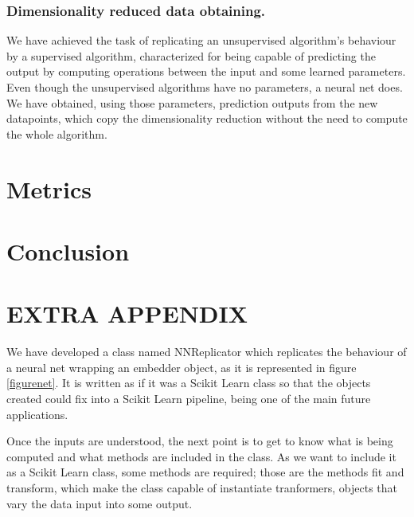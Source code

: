 \documentclass[a4paper,11pt,spanish]{report}
\begin{document}
\subsection{Dimensionality reduced data obtaining.}
\label{ssec:trans}

We have achieved the task of replicating an unsupervised algorithm's behaviour by a supervised algorithm, characterized for being capable of predicting the output by computing operations between the input and some learned parameters.
Even though the unsupervised algorithms have no parameters, a neural net does. We have obtained, using those parameters, prediction outputs from the new datapoints, which copy the dimensionality reduction without the need to compute the whole algorithm.


\chapter{Metrics}
\label{chap:met}



\chapter{Conclusion}
\label{chap:conc}



\chapter{EXTRA APPENDIX}
\label{chap:append}

We have developed a class named NNReplicator which replicates the behaviour of a neural net wrapping an embedder object, as it is represented in figure \ref{figurenet}. It is written as if it was a Scikit Learn class so that the objects created could fix into a Scikit Learn pipeline, being one of the main future applications.

Once the inputs are understood, the next point is to get to know what is being computed and what methods are included in the class. As we want to include it as a Scikit Learn class, some methods are required; those are the methods fit and transform, which make the class capable of instantiate tranformers, objects that vary the data input into some output.
\end{document}
